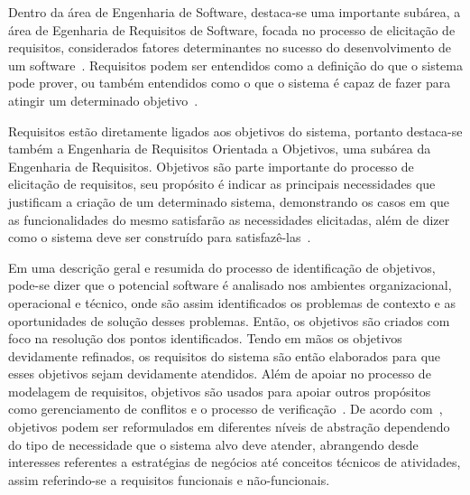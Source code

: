 Dentro da área de Engenharia de Software, destaca-se uma importante subárea, a área de Egenharia de Requisitos de Software, focada no processo de elicitação de requisitos, considerados fatores determinantes no sucesso do desenvolvimento de um software~\cite{falboEngReq}. Requisitos podem ser entendidos como a definição do que o sistema pode prover, ou também entendidos como o que o sistema é capaz de fazer para atingir um determinado objetivo~\cite{pfleeger2004engenharia}.

Requisitos estão diretamente ligados aos objetivos do sistema, portanto destaca-se também a Engenharia de Requisitos Orientada a Objetivos, uma subárea da Engenharia de Requisitos. Objetivos são parte importante do processo de elicitação de requisitos, seu propósito é indicar as principais necessidades que justificam a criação de um determinado sistema, demonstrando os casos em que as funcionalidades do mesmo satisfarão as necessidades elicitadas, além de dizer como o sistema deve ser construído para satisfazê-las~\cite{ross1977structured}. 

Em uma descrição geral e resumida do processo de identificação de objetivos, pode-se dizer que o potencial software é analisado nos ambientes organizacional, operacional e técnico, onde são assim identificados os problemas de contexto e as oportunidades de solução desses problemas. Então, os objetivos são criados com foco na resolução dos pontos identificados. Tendo em mãos os objetivos devidamente refinados, os requisitos do sistema são então elaborados para que esses objetivos sejam devidamente atendidos. Além de apoiar no processo de modelagem de requisitos, objetivos são usados para apoiar outros propósitos como gerenciamento de conflitos e o processo de verificação~\cite{lapouchnian2005goal}. De acordo com~, objetivos podem ser reformulados em diferentes níveis de abstração dependendo do tipo de necessidade que o sistema alvo deve atender, abrangendo desde interesses referentes a estratégias de negócios até conceitos técnicos de atividades, assim referindo-se a requisitos funcionais e não-funcionais.

